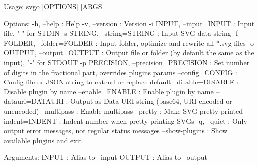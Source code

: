 \begin{DoxyCode}
Usage:
  svgo [OPTIONS] [ARGS]

Options:
  -h, --help : Help
  -v, --version : Version
  -i INPUT, --input=INPUT : Input file, "-" for STDIN
  -s STRING, --string=STRING : Input SVG data string
  -f FOLDER, --folder=FOLDER : Input folder, optimize and rewrite all *.svg files
  -o OUTPUT, --output=OUTPUT : Output file or folder (by default the same as the input), "-" for STDOUT
  -p PRECISION, --precision=PRECISION : Set number of digits in the fractional part, overrides plugins
       params
  --config=CONFIG : Config file or JSON string to extend or replace default
  --disable=DISABLE : Disable plugin by name
  --enable=ENABLE : Enable plugin by name
  --datauri=DATAURI : Output as Data URI string (base64, URI encoded or unencoded)
  --multipass : Enable multipass
  --pretty : Make SVG pretty printed
  --indent=INDENT : Indent number when pretty printing SVGs
  -q, --quiet : Only output error messages, not regular status messages
  --show-plugins : Show available plugins and exit

Arguments:
  INPUT : Alias to --input
  OUTPUT : Alias to --output
\end{DoxyCode}



